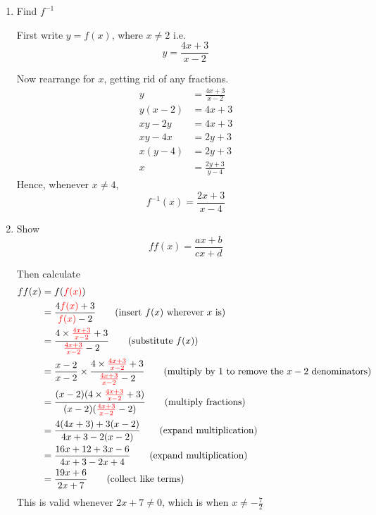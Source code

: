 \begin{solution}


    \begin{enumerate}
        \item
        Find $f^{-1}$

        First write $y = f(x)$, where $x \neq 2$ i.e.
        \[ y = \frac{4x + 3}{x-2} \]

        Now rearrange for $x$, getting rid of any fractions.
        \begin{align*}
            y &= \frac{4x + 3}{x-2} \\
             y(x-2) &= 4x + 3 \tag{multiply by $(x-2)$} \\
             xy - 2y &= 4x + 3 \tag{expand} \\
             xy - 4x &= 2y+3 \tag{collect $x$ terms to one side} \\
             x(y-4) &= 2y + 3 \tag{factorise LHS} \\
             x &= \frac{2y+3}{y-4} \tag{assuming $y \neq 4$}
        \end{align*}
        Hence, whenever $x \neq 4$, 
        \[ f^{-1}(x) = \frac{2x+3}{x-4}\]
        \item 
        Show  
        \[ff(x) = \frac{ax + b}{cx + d}\]

        Then calculate 
        \begin{align*}
            ff(x) &= f(\textcolor{red}{f(x)}) \\
             &= \frac{4\textcolor{red}{f(x)} + 3}{\textcolor{red}{f(x)}-2}  \tag{insert $f(x)$ wherever $x$ is}\\
             &=  \frac{4\times \textcolor{red}{\frac{4x + 3}{x-2}} + 3}{\textcolor{red}{\frac{4x + 3}{x-2}}-2} \tag{substitute $f(x)$}\\
             &= \frac{x-2}{x-2} \times \frac{4\times \textcolor{red}{\frac{4x + 3}{x-2}} + 3}{\textcolor{red}{\frac{4x + 3}{x-2}}-2} \tag{multiply by $1$ to remove the $x-2$ denominators}\\
             &= \frac{(x-2) (4\times \textcolor{red}{\frac{4x + 3}{x-2}} + 3)}{(x-2)(\textcolor{red}{\frac{4x + 3}{x-2}}-2)} \tag{multiply fractions} \\
             &= \frac{4(4x + 3) + 3(x-2)}{4x + 3 - 2(x-2)} \tag{expand multiplication} \\
             &= \frac{16x + 12 + 3x - 6}{4x + 3 - 2x + 4} \tag{expand multiplication} \\
             &= \frac{19x + 6}{2x + 7} \tag{collect like terms}
        \end{align*}
        This is valid whenever $2x+7 \neq 0$, which is when $x \neq -\frac{7}{2}$


\end{enumerate}
\end{solution}
